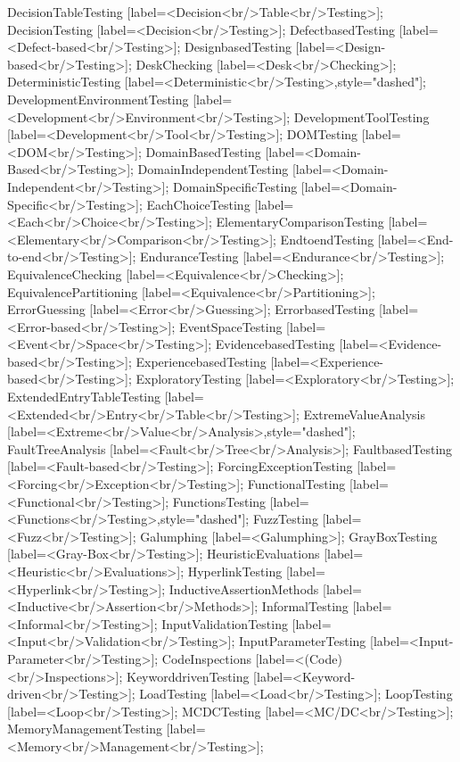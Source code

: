 \documentclass{article}
\begin{document}
{DecisionTableTesting [label=<Decision<br/>Table<br/>Testing>];
DecisionTesting [label=<Decision<br/>Testing>];
DefectbasedTesting [label=<Defect-based<br/>Testing>];
DesignbasedTesting [label=<Design-based<br/>Testing>];
DeskChecking [label=<Desk<br/>Checking>];
DeterministicTesting [label=<Deterministic<br/>Testing>,style="dashed"];
DevelopmentEnvironmentTesting [label=<Development<br/>Environment<br/>Testing>];
DevelopmentToolTesting [label=<Development<br/>Tool<br/>Testing>];
DOMTesting [label=<DOM<br/>Testing>];
DomainBasedTesting [label=<Domain-Based<br/>Testing>];
DomainIndependentTesting [label=<Domain-Independent<br/>Testing>];
DomainSpecificTesting [label=<Domain-Specific<br/>Testing>];
EachChoiceTesting [label=<Each<br/>Choice<br/>Testing>];
ElementaryComparisonTesting [label=<Elementary<br/>Comparison<br/>Testing>];
EndtoendTesting [label=<End-to-end<br/>Testing>];
EnduranceTesting [label=<Endurance<br/>Testing>];
EquivalenceChecking [label=<Equivalence<br/>Checking>];
EquivalencePartitioning [label=<Equivalence<br/>Partitioning>];
ErrorGuessing [label=<Error<br/>Guessing>];
ErrorbasedTesting [label=<Error-based<br/>Testing>];
EventSpaceTesting [label=<Event<br/>Space<br/>Testing>];
EvidencebasedTesting [label=<Evidence-based<br/>Testing>];
ExperiencebasedTesting [label=<Experience-based<br/>Testing>];
ExploratoryTesting [label=<Exploratory<br/>Testing>];
ExtendedEntryTableTesting [label=<Extended<br/>Entry<br/>Table<br/>Testing>];
ExtremeValueAnalysis [label=<Extreme<br/>Value<br/>Analysis>,style="dashed"];
FaultTreeAnalysis [label=<Fault<br/>Tree<br/>Analysis>];
FaultbasedTesting [label=<Fault-based<br/>Testing>];
ForcingExceptionTesting [label=<Forcing<br/>Exception<br/>Testing>];
FunctionalTesting [label=<Functional<br/>Testing>];
FunctionsTesting [label=<Functions<br/>Testing>,style="dashed"];
FuzzTesting [label=<Fuzz<br/>Testing>];
Galumphing [label=<Galumphing>];
GrayBoxTesting [label=<Gray-Box<br/>Testing>];
HeuristicEvaluations [label=<Heuristic<br/>Evaluations>];
HyperlinkTesting [label=<Hyperlink<br/>Testing>];
InductiveAssertionMethods [label=<Inductive<br/>Assertion<br/>Methods>];
InformalTesting [label=<Informal<br/>Testing>];
InputValidationTesting [label=<Input<br/>Validation<br/>Testing>];
InputParameterTesting [label=<Input-Parameter<br/>Testing>];
CodeInspections [label=<(Code)<br/>Inspections>];
KeyworddrivenTesting [label=<Keyword-driven<br/>Testing>];
LoadTesting [label=<Load<br/>Testing>];
LoopTesting [label=<Loop<br/>Testing>];
MCDCTesting [label=<MC/DC<br/>Testing>];
MemoryManagementTesting [label=<Memory<br/>Management<br/>Testing>];
}
\end{document}
